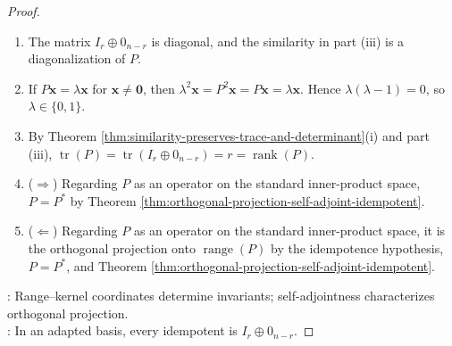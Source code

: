 \begin{proposition}
\begin{proof}
\begin{enumerate}[label=(\roman*)]
\item[$(iv)$] The matrix $I_r\oplus0_{n-r}$ is diagonal, and the similarity in part (iii) is a diagonalization of $P$.
\item[$(v)$] If $P\mathbf{x}=\lambda\mathbf{x}$ for $\mathbf{x}\neq\mathbf{0}$, then $\lambda^2\mathbf{x}=P^2\mathbf{x}=P\mathbf{x}=\lambda\mathbf{x}$. Hence $\lambda(\lambda-1)=0$, so $\lambda\in\{0,1\}$.
\item[$(vi)$] By Theorem \ref{thm:similarity-preserves-trace-and-determinant}(i) and part (iii), $\operatorname{tr}(P)=\operatorname{tr}(I_r\oplus0_{n-r})=r=\operatorname{rank}(P)$.
\item[$(vii)$] ($\Rightarrow$) Regarding $P$ as an operator on the standard inner-product space, $P=P^*$ by Theorem \ref{thm:orthogonal-projection-self-adjoint-idempotent}.
\item[$(vii)$] ($\Leftarrow$) Regarding $P$ as an operator on the standard inner-product space, it is the orthogonal projection onto $\operatorname{range}(P)$ by the idempotence hypothesis, $P=P^*$, and Theorem \ref{thm:orthogonal-projection-self-adjoint-idempotent}.
\end{enumerate}
: Range--kernel coordinates determine invariants; self-adjointness characterizes orthogonal projection.\\
: In an adapted basis, every idempotent is $I_r\oplus0_{n-r}$.
\end{proof}
\end{proposition}
